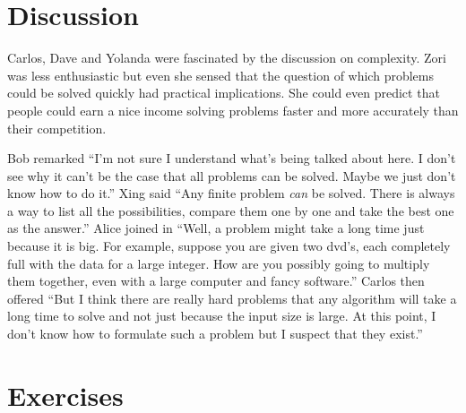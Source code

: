 \section{Discussion}\label{s:basics:discussion}

Carlos, Dave and Yolanda were fascinated by the discussion on complexity.
Zori was less enthusiastic but even 
she sensed that the question of which problems could be solved quickly
had practical implications. She could even predict that people could
earn a nice income solving problems faster and more accurately
than their competition.

Bob remarked ``I'm not sure I understand what's being talked about
here.  I don't see why it can't be the  case that all problems
can be solved.  Maybe we just don't know how to do it.''
Xing said ``Any finite problem \textit{can} be solved.  There
is always a way to list all the possibilities, compare them
one by one and take the best one as the answer.''
Alice joined in ``Well, a problem might take a long time
just because it is big.  For example, suppose you are given
two dvd's, each completely full with the data for a large integer.
How are you possibly going to multiply them together, even
with a large computer and fancy software.''  Carlos then
offered ``But I think there are really hard problems that
any algorithm will take a long time to solve and not just
because the input size is large.  At this point, I don't know how 
to formulate such a problem but I suspect that they exist.''

\section{Exercises}\label{s:basics:exercises}


